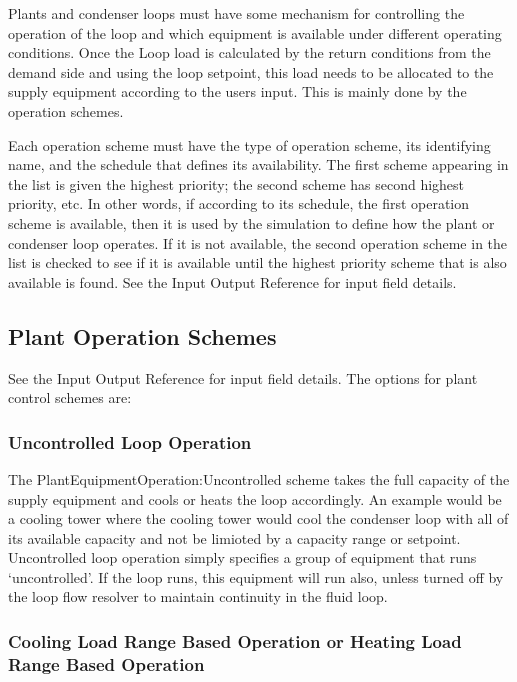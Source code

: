 Plants and condenser loops must have some mechanism for controlling the operation of the loop and which equipment is available under different operating conditions. Once the Loop load is calculated by the return conditions from the demand side and using the loop setpoint, this load needs to be allocated to the supply equipment according to the users input. This is mainly done by the operation schemes.

Each operation scheme must have the type of operation scheme, its identifying name, and the schedule that defines its availability. The first scheme appearing in the list is given the highest priority; the second scheme has second highest priority, etc. In other words, if according to its schedule, the first operation scheme is available, then it is used by the simulation to define how the plant or condenser loop operates. If it is not available, the second operation scheme in the list is checked to see if it is available until the highest priority scheme that is also available is found. See the Input Output Reference for input field details.

\subsection{Plant Operation Schemes}\label{plant-operation-schemes}

See the Input Output Reference for input field details. The options for plant control schemes are:

\subsubsection{Uncontrolled Loop Operation}\label{uncontrolled-loop-operation}

The PlantEquipmentOperation:Uncontrolled scheme takes the full capacity of the supply equipment and cools or heats the loop accordingly. An example would be a cooling tower where the cooling tower would cool the condenser loop with all of its available capacity and not be limioted by a capacity range or setpoint. Uncontrolled loop operation simply specifies a group of equipment that runs `uncontrolled'. If the loop runs, this equipment will run also, unless turned off by the loop flow resolver to maintain continuity in the fluid loop.

\subsubsection{Cooling Load Range Based Operation or Heating Load Range Based Operation}\label{cooling-load-range-based-operation-or-heating-load-range-based-operation}

